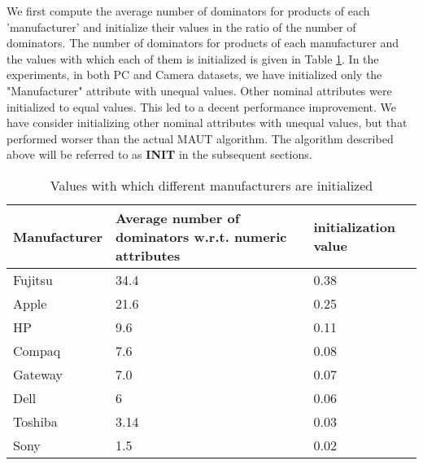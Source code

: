 We first compute the average number of dominators for products of each 'manufacturer' and initialize their values in the ratio of the number of dominators.
The number of dominators for products of each manufacturer and the values with which each of them is initialized is given in Table \ref{tab:marketEq}.
In the experiments, in both PC and Camera datasets, we have initialized only the "Manufacturer" attribute with unequal values. Other nominal attributes were initialized to equal values. This led to a decent performance improvement.
We have consider initializing other nominal attributes with unequal values, but that performed worser than the actual MAUT algorithm.
The algorithm described above will be referred to as \textbf{INIT} in the subsequent sections.


\begin{table}
\renewcommand{\arraystretch}{1.3}
 \centering
 \begin{tabular}{l p{6cm} l}
  \hline \hline
   Manufacturer & Average number of dominators w.r.t. numeric attributes & initialization value \\
  \hline
  Fujitsu & 34.4 & 0.38  \\
  Apple & 21.6 &   0.25\\
  HP & 9.6 &   0.11\\
  Compaq & 7.6&   0.08\\
  Gateway & 7.0 &   0.07\\
  Dell & 6 &   0.06\\
  Toshiba & 3.14 &   0.03\\
  Sony & 1.5 &   0.02\\
  \hline \hline
 \end{tabular}
 \caption{Values with which different manufacturers are initialized}
 \label{tab:marketEq}
\end{table}
